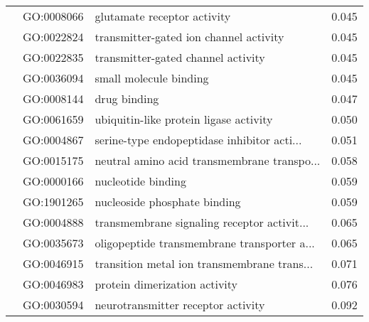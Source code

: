 \begin{longtable}{lllr}
   & GO:0008066 &                  glutamate receptor activity &         0.045 \\
   & GO:0022824 &       transmitter-gated ion channel activity &         0.045 \\
   & GO:0022835 &           transmitter-gated channel activity &         0.045 \\
   & GO:0036094 &                       small molecule binding &         0.045 \\
   & GO:0008144 &                                 drug binding &         0.047 \\
   & GO:0061659 &       ubiquitin-like protein ligase activity &         0.050 \\
   & GO:0004867 &  serine-type endopeptidase inhibitor acti... &         0.051 \\
   & GO:0015175 &  neutral amino acid transmembrane transpo... &         0.058 \\
   & GO:0000166 &                           nucleotide binding &         0.059 \\
   & GO:1901265 &                 nucleoside phosphate binding &         0.059 \\
   & GO:0004888 &  transmembrane signaling receptor activit... &         0.065 \\
   & GO:0035673 &  oligopeptide transmembrane transporter a... &         0.065 \\
   & GO:0046915 &  transition metal ion transmembrane trans... &         0.071 \\
   & GO:0046983 &                protein dimerization activity &         0.076 \\
   & GO:0030594 &           neurotransmitter receptor activity &         0.092 \\
\end{longtable}
